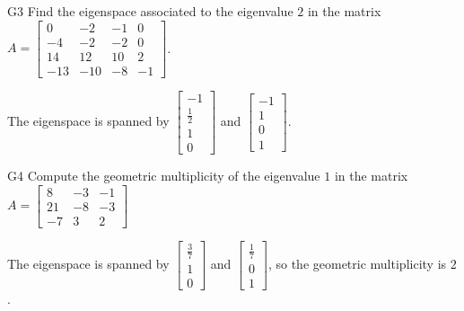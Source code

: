 \documentclass{sbgLAsemi}
\begin{document}
\begin{problem}{G3}
Find the eigenspace associated to the eigenvalue $2$ in the matrix $A=\begin{bmatrix}0 & -2 & -1 & 0 \\ -4 & -2 & -2 & 0 \\ 14 & 12 & 10 & 2 \\ -13 & -10 & -8 & -1 \end{bmatrix}$.
\end{problem}
\begin{solution}
The eigenspace is spanned by $\begin{bmatrix} -1 \\ \frac{1}{2} \\ 1 \\ 0 \end{bmatrix}$ and  $\begin{bmatrix} -1 \\ 1 \\ 0 \\ 1 \end{bmatrix}$.
\end{solution}

\begin{problem}{G4}
Compute the geometric multiplicity of the eigenvalue $1$ in the matrix $A=\begin{bmatrix} 8 & -3 & -1 \\ 21 & -8 & -3 \\ -7 & 3  & 2 \end{bmatrix}$
\end{problem}
\begin{solution}
The eigenspace is spanned by $\begin{bmatrix} \frac{3}{7} \\ 1 \\ 0 \end{bmatrix}$ and $\begin{bmatrix}\frac{1}{7} \\ 0 \\ 1 \end{bmatrix}$, so the geometric multiplicity is $2$.
\end{solution}
\end{document}
